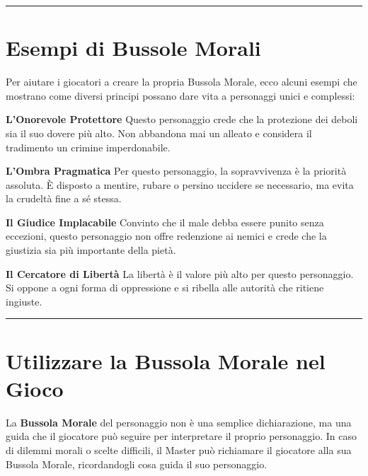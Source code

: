 \documentclass[../manuale_main.tex]{subfiles}
\begin{document}
\vspace{0.5cm}
\noindent
\begin{center}
\rule{\textwidth}{0.4pt} 
\end{center}
\vspace{0.5cm}

\section{Esempi di Bussole Morali}
Per aiutare i giocatori a creare la propria Bussola Morale, ecco alcuni esempi che mostrano come diversi principi possano dare vita a personaggi unici e complessi:

\vspace{0.3cm}

\textbf{L'Onorevole Protettore}  
Questo personaggio crede che la protezione dei deboli sia il suo dovere più alto. Non abbandona mai un alleato e considera il tradimento un crimine imperdonabile.  

\vspace{0.2cm}

\textbf{L'Ombra Pragmatica}  
Per questo personaggio, la sopravvivenza è la priorità assoluta. È disposto a mentire, rubare o persino uccidere se necessario, ma evita la crudeltà fine a sé stessa.  

\vspace{0.2cm}

\textbf{Il Giudice Implacabile}  
Convinto che il male debba essere punito senza eccezioni, questo personaggio non offre redenzione ai nemici e crede che la giustizia sia più importante della pietà.  

\vspace{0.2cm}

\textbf{Il Cercatore di Libertà}  
La libertà è il valore più alto per questo personaggio. Si oppone a ogni forma di oppressione e si ribella alle autorità che ritiene ingiuste.  

\vspace{0.5cm}
\noindent
\begin{center}
\rule{\textwidth}{0.4pt} 
\end{center}
\vspace{0.5cm}

\section{Utilizzare la Bussola Morale nel Gioco}
La \textbf{Bussola Morale} del personaggio non è una semplice dichiarazione, ma una guida che il giocatore può seguire per interpretare il proprio personaggio. In caso di dilemmi morali o scelte difficili, il Master può richiamare il giocatore alla sua Bussola Morale, ricordandogli cosa guida il suo personaggio.
\end{document}
